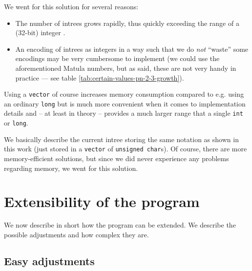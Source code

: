We went for this solution for several reasons:

\begin{itemize}
\item The number of intrees grows rapidly, thus quickly exceeding the range of a (32-bit) integer \cite{oeisrootedtrees}.
\item An encoding of intrees as integers in a way such that we do \emph{not} ``waste'' some encodings may be very cumbersome to implement (we could use the aforementioned Matula numbers, but as said, these are not very handy in practice --- see table \ref{tab:certain-values-pn-2-3-growth}).
\end{itemize}

Using a \texttt{vector} of course increases memory consumption compared to e.g. using an ordinary \texttt{long} but is much more convenient when it comes to implementation details and -- at least in theory -- provides a much larger range that a single \texttt{int} or \texttt{long}.

We basically describe the current intree storing the same notation as shown in this work (just stored in a \texttt{vector} of \texttt{unsigned char}s). Of course, there are more memory-efficient solutions, but since we did never experience any problems regarding memory, we went for this solution.



\section{Extensibility of the program}
\label{sec:implementation-extending-program}

We now describe in short how the program can be extended. We describe the possible adjustments and how complex they are.

\subsection{Easy adjustments}
\label{sec:implementation-extensions-easy}

